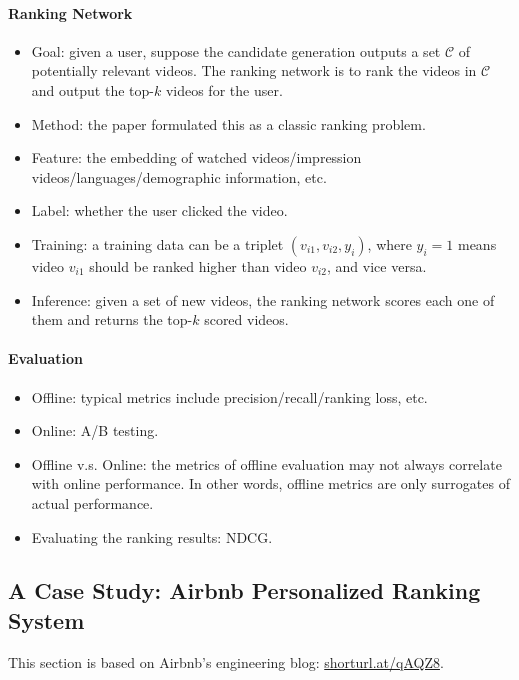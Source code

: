     \paragraph{Ranking Network}
        \begin{itemize}
            \item Goal: given a user, suppose the candidate generation outputs a set $\mathcal{C}$ of potentially relevant videos.
            The ranking network is to rank the videos in $\mathcal{C}$ and output the top-$k$ videos for the user.
            \item Method: the paper formulated this as a classic ranking problem.
            \item Feature: the embedding of watched videos/impression videos/languages/demographic information, etc.
            \item Label: whether the user clicked the video.
            \item Training: a training data can be a triplet $(v_{i1}, v_{i2}, y_i)$, where $y_i=1$ means video $v_{i1}$ should be ranked higher than video $v_{i2}$, and vice versa.
            \item Inference: given a set of new videos, the ranking network scores each one of them and returns the top-$k$ scored videos.
        \end{itemize}
    \paragraph{Evaluation}
        \begin{itemize}
            \item Offline: typical metrics include precision/recall/ranking loss, etc.
            \item Online: A/B testing.
            \item Offline v.s. Online: the metrics of offline evaluation may not always correlate with online performance.
            In other words, offline metrics are only surrogates of actual performance.
            \item Evaluating the ranking results: NDCG.
        \end{itemize}
        
        
\subsection{A Case Study: Airbnb Personalized Ranking System}
    This section is based on Airbnb's engineering blog: \url{shorturl.at/qAQZ8}.
    
